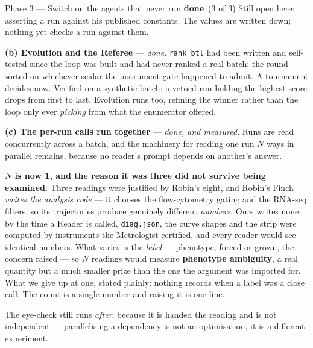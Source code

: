 \documentclass[11pt,a4paper]{article}
\newcommand{\code}[1]{\texttt{#1}}
\newcommand{\dn}{\textcolor{good}{\textbf{done}}}
\begin{document}
\begin{phasebox}{Phase 3 --- Switch on the agents that never run \hfill \dn\ (3 of 3)}
Still open here: asserting a run against his published constants. The values are written down;
nothing yet checks a run against them.

\textbf{(b) Evolution and the Referee} --- \emph{done}. \code{rank\_btl} had been written and
self-tested since the loop was built and had never ranked a real batch; the round sorted on
whichever scalar the instrument gate happened to admit. A tournament decides now. Verified on a
synthetic batch: a vetoed run holding the highest score drops from first to last. Evolution runs
too, refining the winner rather than the loop only ever \emph{picking} from what the enumerator
offered.

\textbf{(c) The per-run calls run together} --- \emph{done, and measured}. Runs are read
concurrently across a batch, and the machinery for reading one run $N$ ways in parallel remains,
because no reader's prompt depends on another's answer.

\textbf{$N$ is now 1, and the reason it was three did not survive being examined.} Three readings
were justified by Robin's eight, and Robin's Finch \emph{writes the analysis code} --- it chooses
the flow-cytometry gating and the RNA-seq filters, so its trajectories produce genuinely different
\emph{numbers}. Ours writes none: by the time a Reader is called, \code{diag.json}, the curve shapes
and the strip were computed by instruments the Metrologist certified, and every reader would see
identical numbers. What varies is the \emph{label} --- phenotype, forced-or-grown, the concern
raised --- so $N$ readings would measure \textbf{phenotype ambiguity}, a real quantity but a much
smaller prize than the one the argument was imported for. What we give up at one, stated plainly:
nothing records when a label was a close call. The count is a single number and raising it is one
line.

The eye-check still runs \emph{after}, because it is handed the reading and is not independent ---
parallelising a dependency is not an optimisation, it is a different experiment.
\end{phasebox}
\end{document}
